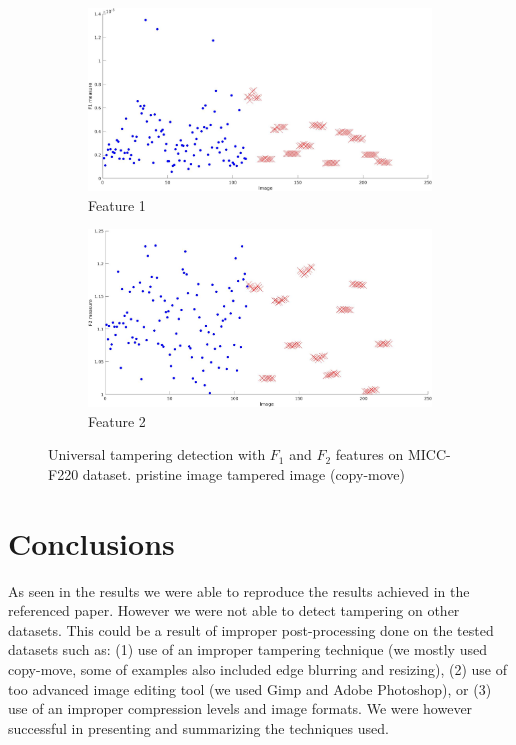 \documentclass{template/acm_proc_article-sp}
\newcommand{\markx}{\ding{53}}
\newcommand{\marko}{\ding{108}}
\begin{document}
\begin{figure}[H]
\centering

\begin{subfigure}{0.46\textwidth}
    \includegraphics[trim=0 0 0 0,clip,width=\linewidth]{report/results/f1_results.jpg}
    \caption{Feature 1}
\end{subfigure}

\begin{subfigure}{0.46\textwidth}
    \includegraphics[trim=0 0 0 0,clip,width=\linewidth]{report/results/f2_results.jpg}
    \caption{Feature 2}
\end{subfigure}

\caption{Universal tampering detection with $F_1$ and $F_2$ features on MICC-F220 dataset.
\newline{\color{blue}\marko} pristine image \newline{\color{red}\markx} tampered image (copy-move)}
\label{img_f1_f2_universal}
\end{figure}

\section{Conclusions}
As seen in the results we were able to reproduce the results achieved in the 
referenced paper. However we were not able to detect tampering on other datasets.
This could be a result of improper post-processing done on the tested datasets such as: (1) use of an improper tampering technique (we mostly used copy-move, some of examples also included edge blurring and resizing), (2) use of too advanced image editing tool (we used Gimp and Adobe Photoshop), or (3) use of an improper compression levels and image formats. We were however successful in presenting and summarizing the techniques used.



\end{document}
